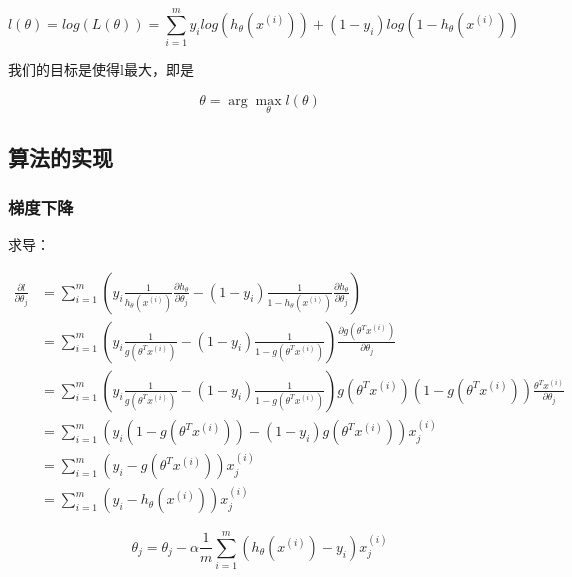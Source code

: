 \documentclass{ML}
\begin{document}
$$l(\theta)=log(L(\theta))=\sum_{i=1}^{m} {y_i}log{(h_{\theta}(x^{(i)}))} + ({1-y_i})log{(1-h_{\theta}(x^{(i)}))}$$

我们的目标是使得l最大，即是

$$\theta = \arg \max_\theta l(\theta)$$

\subsection{算法的实现}

\subsubsection{梯度下降}

求导：


$$\begin{array}{ll}
		\frac{\partial l}{\partial \theta_j} & =  ∑^m_{i=1}(y_i \frac{1}{h_\theta(x^{(i)})} \frac{\partial h_\theta}{\partial \theta_j} -(1-y_i)\frac{1}{1-h_\theta(x^{(i)})}\frac{\partial h_\theta}{\partial \theta_j}) \\
		                                     & = ∑^m_{i=1}(y_i \frac{1}{g(\theta^Tx^{(i)})} - (1-y_i)\frac{1}{1 - g(\theta^Tx^{(i)})})\frac{\partial g(\theta^Tx^{(i)})}{\partial \theta_j}                               \\
		                                     & = ∑^m_{i=1}(y_i \frac{1}{g(\theta^Tx^{(i)})} - (1-y_i)\frac{1}{1 - g(\theta^Tx^{(i)})})g(\theta^Tx^{(i)})(1-g(\theta^Tx^{(i)}))\frac{\theta^Tx^{(i)}}{\partial \theta
		_j}                                                                                                                                                                                                               \\
		                                     & = ∑^m_{i=1}(y_i(1-g(\theta^Tx^{(i)})) - (1-y_i)g(\theta^Tx^{(i)}))x^{(i)}_j                                                                                                \\
		                                     & = ∑^m_{i=1}(y_i-g(\theta^Tx^{(i)}))x^{(i)}_j                                                                                                                               \\
		                                     & = ∑^m_{i=1}(y_i - h_\theta(x^{(i)}))x^{(i)}_j
	\end{array}$$

$$\theta_j = \theta_j - α \frac{1}{m}∑^m_{i=1}(h_\theta(x^{(i)})-y_i)x^{(i)}_j$$
\end{document}
